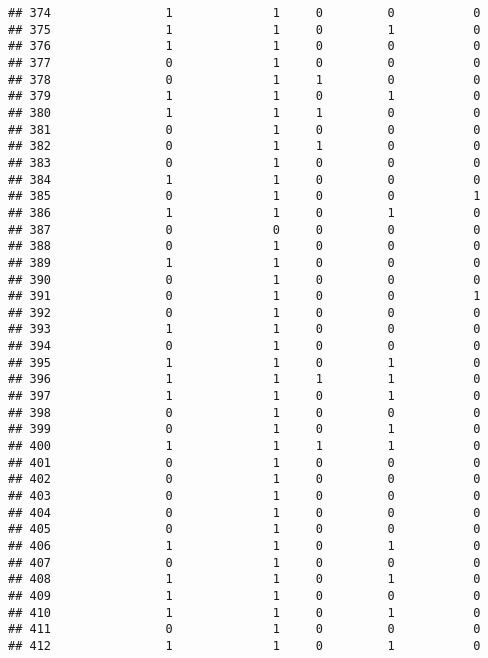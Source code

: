 \documentclass[]{article}
\begin{document}
\begin{verbatim}
## 374                1              1     0         0           0
## 375                1              1     0         1           0
## 376                1              1     0         0           0
## 377                0              1     0         0           0
## 378                0              1     1         0           0
## 379                1              1     0         1           0
## 380                1              1     1         0           0
## 381                0              1     0         0           0
## 382                0              1     1         0           0
## 383                0              1     0         0           0
## 384                1              1     0         0           0
## 385                0              1     0         0           1
## 386                1              1     0         1           0
## 387                0              0     0         0           0
## 388                0              1     0         0           0
## 389                1              1     0         0           0
## 390                0              1     0         0           0
## 391                0              1     0         0           1
## 392                0              1     0         0           0
## 393                1              1     0         0           0
## 394                0              1     0         0           0
## 395                1              1     0         1           0
## 396                1              1     1         1           0
## 397                1              1     0         1           0
## 398                0              1     0         0           0
## 399                0              1     0         1           0
## 400                1              1     1         1           0
## 401                0              1     0         0           0
## 402                0              1     0         0           0
## 403                0              1     0         0           0
## 404                0              1     0         0           0
## 405                0              1     0         0           0
## 406                1              1     0         1           0
## 407                0              1     0         0           0
## 408                1              1     0         1           0
## 409                1              1     0         0           0
## 410                1              1     0         1           0
## 411                0              1     0         0           0
## 412                1              1     0         1           0

\end{verbatim}
\end{document}
